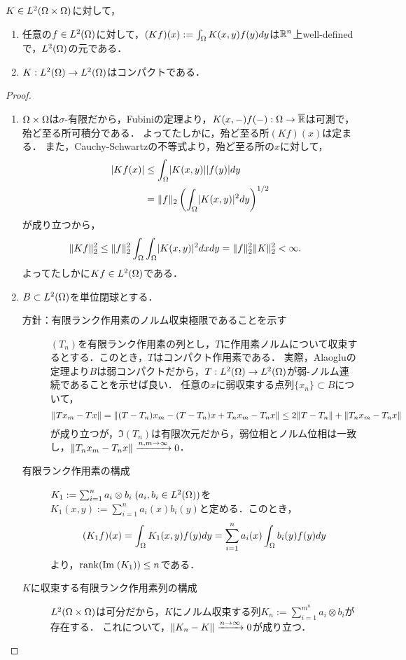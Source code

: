 \documentclass[uplatex,dvipdfmx]{jsarticle}
\begin{document}
\begin{proposition}
    $K\in L^2(\Omega\times\Omega)$に対して，
    \begin{enumerate}
        \item 任意の$f\in L^2(\Omega)$に対して，$(Kf)(x):=\int_\Omega K(x,y)f(y)dy$は$\mathbb{R}^n$上well-definedで，$L^2(\Omega)$の元である．
        \item $K:L^2(\Omega)\to L^2(\Omega)$はコンパクトである．
    \end{enumerate}
\end{proposition}
\begin{proof}\mbox{}
    \begin{enumerate}
        \item $\Omega\times\Omega$は$\sigma$-有限だから，Fubiniの定理より，$K(x,-)f(-):\Omega\to\overline{\mathbb{R}}$は可測で，殆ど至る所可積分である．
        よってたしかに，殆ど至る所$(Kf)(x)$は定まる．
        また，Cauchy-Schwartzの不等式より，殆ど至る所の$x$に対して，
        \begin{align*}
            \lvert Kf(x)\rvert&\le\int_\Omega\lvert K(x,y)\rvert\lvert f(y)\rvert dy\\
            &=\|f\|_2\left(\int_\Omega\lvert K(x,y)\rvert^2dy\right)^{1/2}
        \end{align*}
        が成り立つから，
        \begin{align*}
            \|Kf\|_2^2&\le\|f\|_2^2\int_\Omega\int_\Omega\lvert K(x,y)\rvert^2dxdy=\|f\|_2^2\|K\|_2^2<\infty.
        \end{align*}
        よってたしかに$Kf\in L^2(\Omega)$である．
        \item $B\subset L^2(\Omega)$を単位閉球とする．
        \begin{description}
            \item[方針：有限ランク作用素のノルム収束極限であることを示す] $(T_n)$を有限ランク作用素の列とし，$T$に作用素ノルムについて収束するとする．このとき，$T$はコンパクト作用素である．
            実際，Alaogluの定理より$B$は弱コンパクトだから，$T:L^2(\Omega)\to L^2(\Omega)$が弱-ノルム連続であることを示せば良い．
            任意の$x$に弱収束する点列$\{x_n\}\subset B$について，
            \[\|Tx_m-Tx\|=\|(T-T_n)x_m-(T-T_n)x+T_nx_m-T_nx\|\le2\|T-T_n\|+\|T_nx_m-T_nx\|\]
            が成り立つが，$\Im(T_n)$は有限次元だから，弱位相とノルム位相は一致し，$\|T_nx_m-T_nx\|\xrightarrow{n,m\to\infty}0$．
            \item[有限ランク作用素の構成] 
            $K_1:=\sum_{i=1}^na_i\otimes b_i\;(a_i,b_i\in L^2(\Omega))$を
            $K_1(x,y):=\sum_{i=1}^na_i(x)b_i(y)$と定める．このとき，
            \[(K_1f)(x)=\int_\Omega K_1(x,y)f(y)dy=\sum_{i=1}^na_i(x)\int_\Omega b_i(y)f(y)dy\]
            より，$\mathrm{rank}(\mathrm{Im}\;(K_1))\le n$である．
            \item[$K$に収束する有限ランク作用素列の構成] 
            $L^2(\Omega\times\Omega)$は可分だから，$K$にノルム収束する列$K_n:=\sum_{i=1}^{m^n}a_i\otimes b_i$が存在する．
            これについて，$\|K_n-K\|\xrightarrow{n\to\infty}0$が成り立つ．
        \end{description}
    \end{enumerate}
\end{proof}
\end{document}
